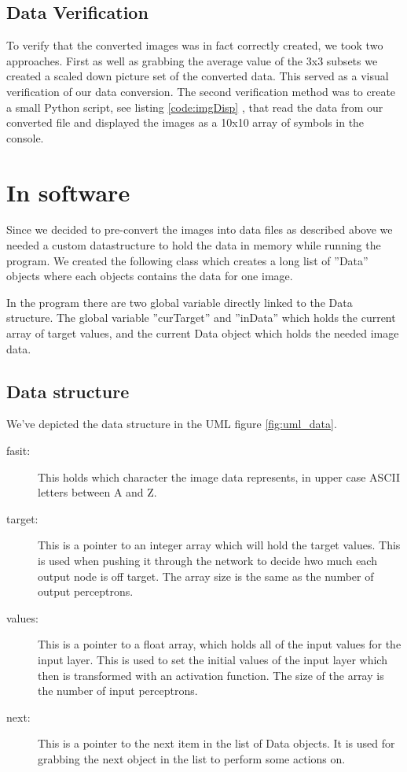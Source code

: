 \subsection{Data Verification}
To verify that the converted images was in fact correctly created, we took two
approaches. First as well as grabbing the average value of the 3x3 subsets we
created a scaled down picture set of the converted data. This served as a visual
verification of our data conversion.  The second verification method was to
create a small Python script, see listing \ref{code:imgDisp} , that read the
data from our converted file and displayed the images as a 10x10 array of
symbols in the console.

\section{In software}
Since we decided to pre-convert the images into data files as described above we
needed a custom datastructure to hold the data in memory while running the
program.  We created the following class which creates a long list of ''Data''
objects where each objects contains the data for one image.

In the program there are two global variable directly linked to the Data
structure. The global variable ''curTarget'' and ''inData'' which holds the
current array of target values, and the current Data object which holds the
needed image data.

\subsection{Data structure}
We've depicted the data structure in the UML figure \ref{fig:uml_data}.
\begin{description}
\item[fasit:]		This holds which character the image data represents, in upper
	case ASCII letters between A and Z.

\item[target:]	This is a pointer to an integer array which will hold the target
	values.  This is used when pushing it through the network to decide hwo much
	each output node is off target. The array size is the same as the number of
	output \gls{perceptron}s.

\item[values:]	This is a pointer to a float array, which holds all of the input
	values for the input layer.  This is used to set the initial values of the
	input layer which then is transformed with an activation function.  The size
	of the array is the number of input \gls{perceptron}s.

\item[next:]		This is a pointer to the next item in the list of Data objects.
	It is used for grabbing the next object in the list to perform some actions
	on.
\end{description}



